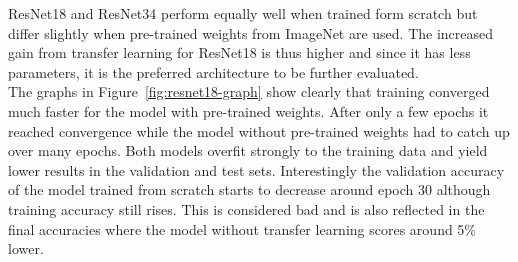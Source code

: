 \begin{table}[!h] \centering
{}
\caption{Hyper parameters for ResNet18 and ResNet34 optimized with SigOpt. First row shows hyperparameters training the architecture from scratch. Second row used pre-trained weights from ImageNet.}
\label{tbl:ResNet18_overview}
\end{table}

ResNet18 and ResNet34 perform equally well when trained form scratch but differ slightly when pre-trained weights from ImageNet are used. The increased gain from transfer learning for ResNet18 is thus higher and since it has less parameters, it is the preferred architecture to be further evaluated.\\

The graphs in Figure~\ref{fig:resnet18-graph} show clearly that training converged much faster for the model with pre-trained weights. After only a few epochs it reached convergence while the model without pre-trained weights had to catch up over many epochs. Both models overfit strongly to the training data and yield lower results in the validation and test sets. Interestingly the validation accuracy of the model trained from scratch starts to decrease around epoch 30 although training accuracy still rises. This is considered bad and is also reflected in the final accuracies where the model without transfer learning scores around 5\% lower. \\


